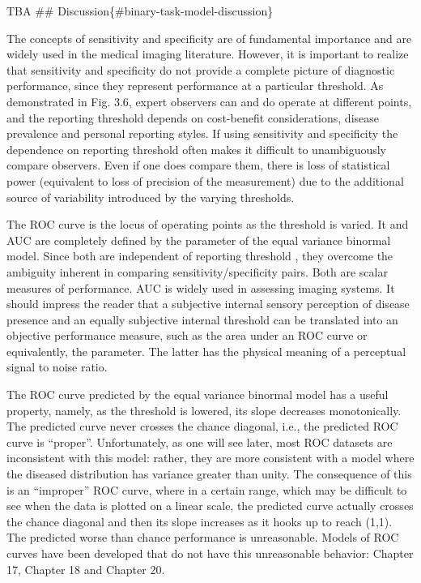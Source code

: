 \documentclass[
]{book}
\begin{document}
TBA
\#\# Discussion\{\#binary-task-model-discussion\}

The concepts of sensitivity and specificity are of fundamental importance and are widely used in the medical imaging literature. However, it is important to realize that sensitivity and specificity do not provide a complete picture of diagnostic performance, since they represent performance at a particular threshold. As demonstrated in Fig. 3.6, expert observers can and do operate at different points, and the reporting threshold depends on cost-benefit considerations, disease prevalence and personal reporting styles. If using sensitivity and specificity the dependence on reporting threshold often makes it difficult to unambiguously compare observers. Even if one does compare them, there is loss of statistical power (equivalent to loss of precision of the measurement) due to the additional source of variability introduced by the varying thresholds.

The ROC curve is the locus of operating points as the threshold is varied. It and AUC are completely defined by the parameter of the equal variance binormal model. Since both are independent of reporting threshold , they overcome the ambiguity inherent in comparing sensitivity/specificity pairs. Both are scalar measures of performance. AUC is widely used in assessing imaging systems. It should impress the reader that a subjective internal sensory perception of disease presence and an equally subjective internal threshold can be translated into an objective performance measure, such as the area under an ROC curve or equivalently, the parameter. The latter has the physical meaning of a perceptual signal to noise ratio.

The ROC curve predicted by the equal variance binormal model has a useful property, namely, as the threshold is lowered, its slope decreases monotonically. The predicted curve never crosses the chance diagonal, i.e., the predicted ROC curve is ``proper''. Unfortunately, as one will see later, most ROC datasets are inconsistent with this model: rather, they are more consistent with a model where the diseased distribution has variance greater than unity. The consequence of this is an ``improper'' ROC curve, where in a certain range, which may be difficult to see when the data is plotted on a linear scale, the predicted curve actually crosses the chance diagonal and then its slope increases as it hooks up to reach (1,1). The predicted worse than chance performance is unreasonable. Models of ROC curves have been developed that do not have this unreasonable behavior: Chapter 17, Chapter 18 and Chapter 20.
\end{document}
